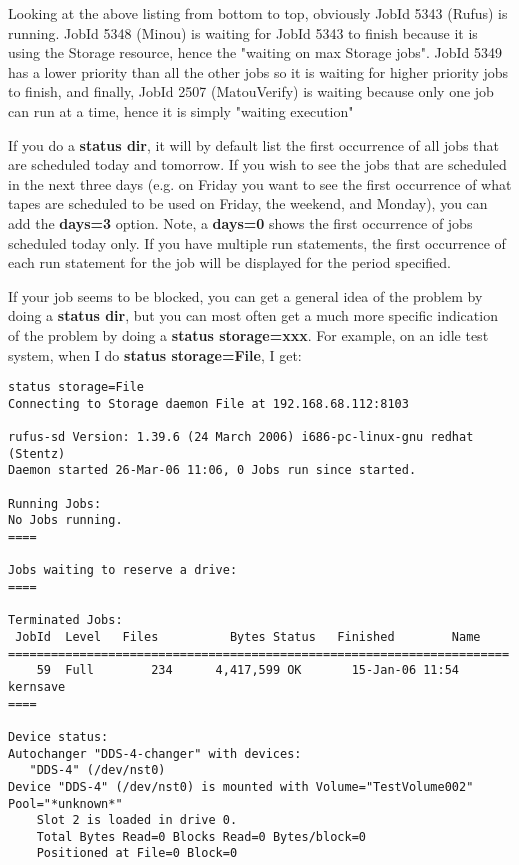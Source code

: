 \begin{description}
   Looking at the above listing from bottom to top, obviously JobId 5343
   (Rufus) is running.  JobId 5348 (Minou) is waiting for JobId 5343 to
   finish because it is using the Storage resource, hence the "waiting on
   max Storage jobs".  JobId 5349 has a lower priority than all the other
   jobs so it is waiting for higher priority jobs to finish, and finally,
   JobId 2507 (MatouVerify) is waiting because only one job can run at a
   time, hence it is simply "waiting execution"

   If you do a {\bf status dir}, it will by default list the first
   occurrence of all jobs that are scheduled today and tomorrow.  If you
   wish to see the jobs that are scheduled in the next three days (e.g.  on
   Friday you want to see the first occurrence of what tapes are scheduled
   to be used on Friday, the weekend, and Monday), you can add the {\bf
   days=3} option.  Note, a {\bf days=0} shows the first occurrence of jobs
   scheduled today only.  If you have multiple run statements, the first
   occurrence of each run statement for the job will be displayed for the
   period specified.

   If your job seems to be blocked, you can get a general idea of the
   problem by doing a {\bf status dir}, but you can most often get a 
   much more specific indication of the problem by doing a
   {\bf status storage=xxx}.  For example, on an idle test system, when
   I do {\bf status storage=File}, I get:
\footnotesize
\begin{verbatim}
status storage=File
Connecting to Storage daemon File at 192.168.68.112:8103

rufus-sd Version: 1.39.6 (24 March 2006) i686-pc-linux-gnu redhat (Stentz)
Daemon started 26-Mar-06 11:06, 0 Jobs run since started.

Running Jobs:
No Jobs running.
====

Jobs waiting to reserve a drive:
====

Terminated Jobs:
 JobId  Level   Files          Bytes Status   Finished        Name 
======================================================================
    59  Full        234      4,417,599 OK       15-Jan-06 11:54 kernsave
====

Device status:
Autochanger "DDS-4-changer" with devices:
   "DDS-4" (/dev/nst0)
Device "DDS-4" (/dev/nst0) is mounted with Volume="TestVolume002"
Pool="*unknown*"
    Slot 2 is loaded in drive 0.
    Total Bytes Read=0 Blocks Read=0 Bytes/block=0
    Positioned at File=0 Block=0


\end{verbatim}
\end{description}
